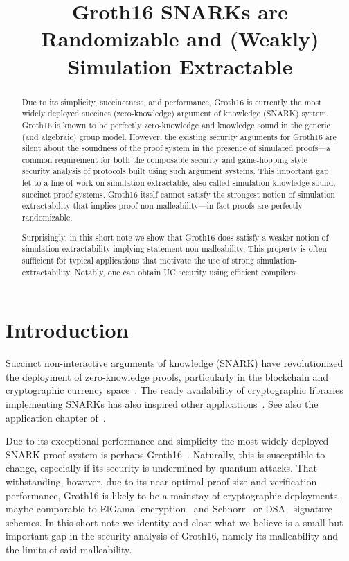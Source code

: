 \documentclass[a4paper, 9pt]{article}
\title{Groth16 SNARKs are \\ Randomizable and (Weakly) Simulation Extractable}
\newcommand{\Gro}{\textsf{Groth16}}
\begin{document}
\maketitle

\begin{abstract}
  Due to its simplicity, succinctness, and performance, \Gro{} is
  currently the most widely deployed succinct (zero-knowledge) argument of
  knowledge (SNARK) system. \Gro{} is
  known to be perfectly zero-knowledge and knowledge sound in the generic (and
  algebraic) group model. However, the existing security arguments for \Gro{} are
  silent about the soundness of the proof system in the presence of simulated
  proofs---a common requirement for both the composable security and game-hopping
  style security analysis of
  protocols built using such argument systems. This important gap let to a line of work on
  simulation-extractable, also called simulation knowledge sound, succinct proof systems.
  \Gro{} itself cannot satisfy the strongest
  notion of simulation-extractability that implies proof
  non-malleability---in fact proofs are perfectly randomizable.

  Surprisingly, in this short note we show that \Gro{} does satisfy a
  weaker notion of simulation-extractability implying statement
  non-malleability. This property is often sufficient for typical
  applications that motivate the use of strong
  simulation-extractability. Notably, one can obtain UC security using
  efficient compilers.
\end{abstract}

\section{Introduction}


Succinct non-interactive arguments of knowledge (SNARK) have
revolutionized the deployment of zero-knowledge proofs, particularly
in the blockchain and cryptographic currency
space~\cite{DBLP:conf/sp/Ben-SassonCG0MTV14, kosba2016hawk,
  DBLP:journals/iacr/KerberKK20a, DBLP:journals/iacr/BoweCGMMW18}. The
ready availability of cryptographic libraries implementing SNARKs has
also inspired other
applications~\cite{DBLP:conf/sp/NavehT16,DBLP:conf/sp/Delignat-Lavaud16}. See
also the application chapter of~\cite{zkproof}.

Due to its exceptional performance and simplicity the most widely
deployed SNARK proof system is perhaps \Gro{}~\cite{gro16}. Naturally,
this is susceptible to change, especially if its security is
undermined by quantum attacks. That withstanding, however, due to its
near optimal proof size and verification performance, \Gro{} is likely
to be a mainstay of cryptographic deployments, maybe comparable to
ElGamal encryption~\cite{DBLP:journals/tit/Elgamal85} and
Schnorr~\cite{DBLP:journals/joc/Schnorr91} or
DSA~\cite{dsa} signature schemes.
%
In this short note we identity and close what we believe is a small
but important gap in the security analysis of \Gro{}, namely its
malleability and the limits of said malleability.
\end{document}
